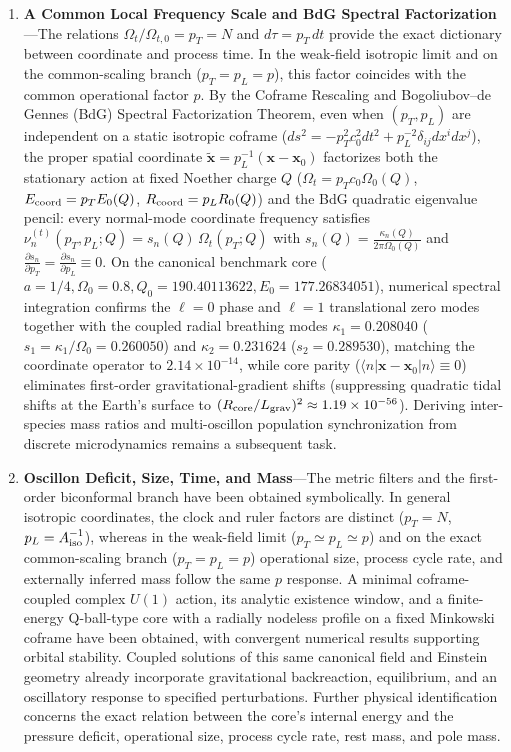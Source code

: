 \documentclass[11pt,a4paper]{article}
\begin{document}
\begin{enumerate}[label=\arabic*.]
\item \textbf{A Common Local Frequency Scale and BdG Spectral Factorization}---The relations $\Omega_t/\Omega_{t,0}=p_T=N$ and $d\tau=p_T\,dt$ provide the exact dictionary between coordinate and process time. In the weak-field isotropic limit and on the common-scaling branch ($p_T=p_L=p$), this factor coincides with the common operational factor $p$. By the Coframe Rescaling and Bogoliubov--de Gennes (BdG) Spectral Factorization Theorem, even when $(p_T, p_L)$ are independent on a static isotropic coframe ($ds^2 = -p_T^2 c_0^2 dt^2 + p_L^{-2}\delta_{ij}dx^i dx^j$), the proper spatial coordinate $\tilde{\mathbf{x}} = p_L^{-1}(\mathbf{x}-\mathbf{x}_0)$ factorizes both the stationary action at fixed Noether charge $Q$ ($\Omega_t = p_T c_0\Omega_0(Q)$, $E_{\rm coord} = p_T E_0(Q)$, $R_{\rm coord} = p_L R_0(Q)$) and the BdG quadratic eigenvalue pencil: every normal-mode coordinate frequency satisfies $\nu_n^{(t)}(p_T, p_L; Q) = s_n(Q)\,\Omega_t(p_T; Q)$ with $s_n(Q) = \frac{\kappa_n(Q)}{2\pi\Omega_0(Q)}$ and $\frac{\partial s_n}{\partial p_T} = \frac{\partial s_n}{\partial p_L} \equiv 0$. On the canonical benchmark core ($a=1/4, \Omega_0=0.8, Q_0 = 190.40113622, E_0 = 177.26834051$), numerical spectral integration confirms the $\ell=0$ phase and $\ell=1$ translational zero modes together with the coupled radial breathing modes $\kappa_1 = 0.208040$ ($s_1 = \kappa_1/\Omega_0 = 0.260050$) and $\kappa_2 = 0.231624$ ($s_2 = 0.289530$), matching the coordinate operator to $2.14\times 10^{-14}$, while core parity ($\langle n|\mathbf{x}-\mathbf{x}_0|n\rangle \equiv 0$) eliminates first-order gravitational-gradient shifts (suppressing quadratic tidal shifts at the Earth's surface to $(R_{\rm core}/L_{\rm grav})^2 \approx 1.19\times 10^{-56}$). Deriving inter-species mass ratios and multi-oscillon population synchronization from discrete microdynamics remains a subsequent task.

\item \textbf{Oscillon Deficit, Size, Time, and Mass}---The metric filters and the first-order biconformal branch have been obtained symbolically. In general isotropic coordinates, the clock and ruler factors are distinct ($p_T = N$, $p_L = A_{\rm iso}^{-1}$), whereas in the weak-field limit ($p_T \simeq p_L \simeq p$) and on the exact common-scaling branch ($p_T = p_L = p$) operational size, process cycle rate, and externally inferred mass follow the same $p$ response. A minimal coframe-coupled complex $U(1)$ action, its analytic existence window, and a finite-energy Q-ball-type core with a radially nodeless profile on a fixed Minkowski coframe have been obtained, with convergent numerical results supporting orbital stability. Coupled solutions of this same canonical field and Einstein geometry already incorporate gravitational backreaction, equilibrium, and an oscillatory response to specified perturbations. Further physical identification concerns the exact relation between the core's internal energy and the pressure deficit, operational size, process cycle rate, rest mass, and pole mass.


\end{enumerate}
\end{document}
